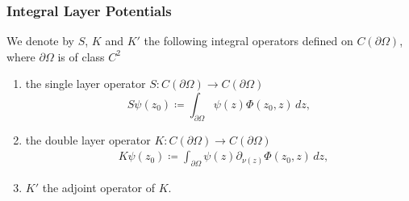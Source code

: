 \documentclass[handout]{beamer}
\begin{document}
\begin{frame}
 \frametitle{Integral Layer Potentials}
\begin{definition}
 We denote by $S$, $K$  and $K'$ the following integral operators 
 defined on $C(\partial \Omega)$, where $\partial \Omega$ is of class $C^2$
 \begin{enumerate}
  \item  the single layer operator $ S: C(\partial \Omega) \to C(\partial \Omega)$
  \begin{equation}
  S\psi(z_0)\coloneqq\int_{\partial \Omega}\psi(z) \Phi(z_0,z)\,dz,\label{def:operator-S}
  \end{equation}
  \item  the double layer operator $ K:C(\partial \Omega) \to C(\partial \Omega)$
  \begin{align}
  & K\psi(z_0)\coloneqq\int_{\partial \Omega} \psi(z) \partial_{\nu(z)} \Phi(z_0, z) \,dz,
  \label{def:operator-K}
  \end{align}
  \item $K'$ the adjoint operator of $K$.
 \end{enumerate}
\end{definition}
\end{frame}
\end{document}
